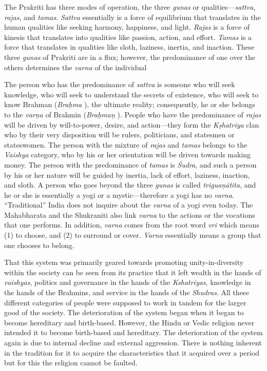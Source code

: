 The Prakriti  has three modes of operation, the three \textit{gunas} or qualities—\textit{sattva},  \textit{rajas},   and \textit{tamas}. \textit{Sattva} essentially is a force of equilibrium that translates in the human qualities like seeking harmony, happiness, and light. \textit{Rajas} is a force of kinesis that translates into qualities like passion, action, and effort. \textit{Tamas} is a force that translates in qualities like sloth, laziness, inertia, and inaction. These three \textit{gunas} of Prakriti  are in a flux; however, the predominance of one over the others determines the \textit{varna} of the individual

The person who has the predominance of \textit{sattva} is someone who will seek knowledge, who will seek to understand the secrets of existence, who will seek to know Brahman (\textit{Braḥma} ), the ultimate reality; consequently, he or she belongs to the \textit{varṇa} of Brahmin (\textit{Braḥmaṇ} ). People who have the predominance of \textit{rajas} will be driven by will-to-power, desire, and action—they form the \textit{Kṣhatriya} clan who by their very disposition will be rulers, politicians, and statesmen or stateswomen. The person with the mixture of \textit{rajas} and \textit{tamas} belongs to the \textit{Vaishya} category, who by his or her orientation will be driven towards making money. The person with the predominance of \textit{tamas} is \textit{Śudra},  and such a person by his or her nature will be guided by inertia, lack of effort, laziness, inaction, and sloth. A person who goes beyond the three \textit{gunas} is called \textit{triguaṇātita},  and he or she is essentially a yogi or a mystic—therefore a yogi has no \textit{varna}. “Traditional” India does not inquire about the \textit{varna} of a yogi even today. The Mahabharata and the Shukraniti also link \textit{varna} to the actions or the vocations that one performs. In addition, \textit{varna} comes from the root word \textit{vri} which means (1) to choose, and (2) to surround or cover. \textit{Varna} essentially means a group that one chooses to belong.

That this system was primarily geared towards promoting unity-in-diversity within the society can be seen from its practice that it left wealth in the hands of \textit{vaishyas},  politics and governance in the hands of the \textit{Kshatriyas},  knowledge in the hands of the Brahmins, and service in the hands of the \textit{Shudras}. All these different categories of people were supposed to work in tandem for the larger good of the society. The deterioration of the system began when it began to become hereditary and birth-based. However, the Hindu or Vedic religion never intended it to become birth-based and hereditary. The deterioration of the system again is due to internal decline and external aggression. There is nothing inherent in the tradition for it to acquire the characteristics that it acquired over a period but for this the religion cannot be faulted.


